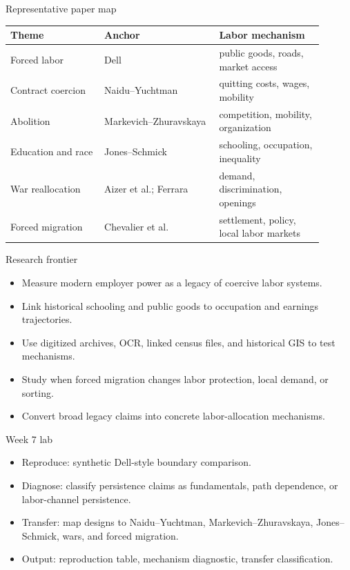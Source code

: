 \documentclass[aspectratio=169,11pt]{beamer}
\begin{document}
\begin{frame}{Representative paper map}
\small
\begin{tabular}{p{0.27\linewidth} p{0.33\linewidth} p{0.30\linewidth}}
\toprule
Theme & Anchor & Labor mechanism \\
\midrule
Forced labor & Dell & public goods, roads, market access \\
Contract coercion & Naidu--Yuchtman & quitting costs, wages, mobility \\
Abolition & Markevich--Zhuravskaya & competition, mobility, organization \\
Education and race & Jones--Schmick & schooling, occupation, inequality \\
War reallocation & Aizer et al.; Ferrara & demand, discrimination, openings \\
Forced migration & Chevalier et al. & settlement, policy, local labor markets \\
\bottomrule
\end{tabular}
\end{frame}

\begin{frame}{Research frontier}
\begin{itemize}
    \item Measure modern employer power as a legacy of coercive labor systems.
    \item Link historical schooling and public goods to occupation and earnings trajectories.
    \item Use digitized archives, OCR, linked census files, and historical GIS to test mechanisms.
    \item Study when forced migration changes labor protection, local demand, or sorting.
    \item Convert broad legacy claims into concrete labor-allocation mechanisms.
\end{itemize}
\end{frame}

\begin{frame}{Week 7 lab}
\begin{itemize}
    \item Reproduce: synthetic Dell-style boundary comparison.
    \item Diagnose: classify persistence claims as fundamentals, path dependence, or labor-channel persistence.
    \item Transfer: map designs to Naidu--Yuchtman, Markevich--Zhuravskaya, Jones--Schmick, wars, and forced migration.
    \item Output: reproduction table, mechanism diagnostic, transfer classification.
\end{itemize}
\end{frame}
\end{document}
